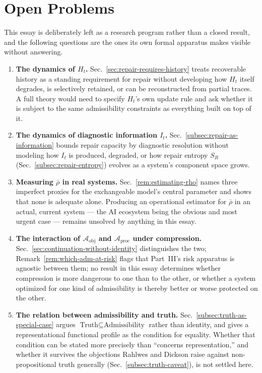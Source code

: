 \documentclass[11pt,a4paper]{article}
\theoremstyle{plain}
\theoremstyle{definition}
\theoremstyle{remark}
\newcommand{\Adm}{\mathcal{A}}
\begin{document}
\section*{Open Problems}

This essay is deliberately left as a research program rather than a closed result, and the following questions are the ones its own formal apparatus makes visible without answering.

\begin{enumerate}
  \item \textbf{The dynamics of $H_t$.} Sec.~\ref{sec:repair-requires-history} treats recoverable history as a standing requirement for repair without developing how $H_t$ itself degrades, is selectively retained, or can be reconstructed from partial traces. A full theory would need to specify $H_t$'s own update rule and ask whether it is subject to the same admissibility constraints as everything built on top of it.
  \item \textbf{The dynamics of diagnostic information $I_t$.} Sec.~\ref{subsec:repair-as-information} bounds repair capacity by diagnostic resolution without modeling how $I_t$ is produced, degraded, or how repair entropy $S_R$ (Sec.~\ref{subsec:repair-entropy}) evolves as a system's component space grows.
  \item \textbf{Measuring $\bar\rho$ in real systems.} Sec.~\ref{rem:estimating-rho} names three imperfect proxies for the exchangeable model's central parameter and shows that none is adequate alone. Producing an operational estimator for $\bar\rho$ in an actual, current system — the AI ecosystem being the obvious and most urgent case — remains unsolved by anything in this essay.
  \item \textbf{The interaction of $\Adm_{\mathrm{obj}}$ and $\Adm_{\mathrm{proc}}$ under compression.} Sec.~\ref{sec:continuation-without-identity} distinguishes the two; Remark~\ref{rem:which-adm-at-risk} flags that Part~III's risk apparatus is agnostic between them; no result in this essay determines whether compression is more dangerous to one than to the other, or whether a system optimized for one kind of admissibility is thereby better or worse protected on the other.
  \item \textbf{The relation between admissibility and truth.} Sec.~\ref{subsec:truth-as-special-case} argues $\text{Truth} \subseteq \text{Admissibility}$ rather than identity, and gives a representational functional profile as the condition for equality. Whether that condition can be stated more precisely than ``concerns representation,'' and whether it survives the objections Rahlwes and Dickson raise against non-propositional truth generally (Sec.~\ref{subsec:truth-caveat}), is not settled here.

\end{enumerate}
\end{document}
